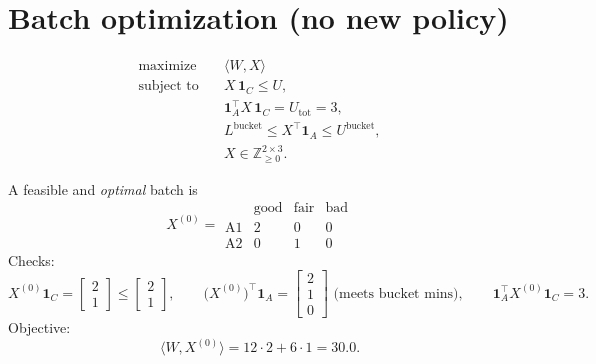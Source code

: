 \documentclass[11pt]{article}
\begin{document}
\section*{Batch optimization (no new policy)}
\[
\begin{aligned}
\text{maximize}\quad & \langle W,X\rangle \\[2pt]
\text{subject to}\quad
& X\,\mathbf{1}_C \le U, \\[2pt]
& \mathbf{1}_A^\top X\,\mathbf{1}_C = U_{\text{tot}}=3, \\[2pt]
& L^{\text{bucket}} \le X^\top \mathbf{1}_A \le U^{\text{bucket}}, \\[2pt]
& X \in \mathbb{Z}_{\ge 0}^{2\times 3}.
\end{aligned}
\]

A feasible and \emph{optimal} batch is
\[
X^{(0)}=
\begin{array}{c|ccc}
 & \text{good} & \text{fair} & \text{bad} \\\hline
\text{A1} & 2 & 0 & 0 \\
\text{A2} & 0 & 1 & 0
\end{array}
\]
Checks:
\[
X^{(0)}\mathbf{1}_C=\begin{bmatrix}2\\[2pt]1\end{bmatrix}\le
\begin{bmatrix}2\\[2pt]1\end{bmatrix},
\qquad
\big(X^{(0)}\big)^\top\mathbf{1}_A=\begin{bmatrix}2\\[2pt]1\\[2pt]0\end{bmatrix}
\text{ (meets bucket mins)},
\qquad
\mathbf{1}_A^\top X^{(0)}\mathbf{1}_C=3.
\]
Objective:
\[
\langle W,X^{(0)}\rangle = 12\cdot 2 + 6\cdot 1 = 30.0.
\]
\end{document}
